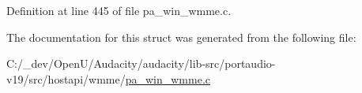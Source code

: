 Definition at line 445 of file pa\+\_\+win\+\_\+wmme.\+c.



The documentation for this struct was generated from the following file\+:\begin{DoxyCompactItemize}
\item 
C\+:/\+\_\+dev/\+Open\+U/\+Audacity/audacity/lib-\/src/portaudio-\/v19/src/hostapi/wmme/\hyperlink{pa__win__wmme_8c}{pa\+\_\+win\+\_\+wmme.\+c}\end{DoxyCompactItemize}
